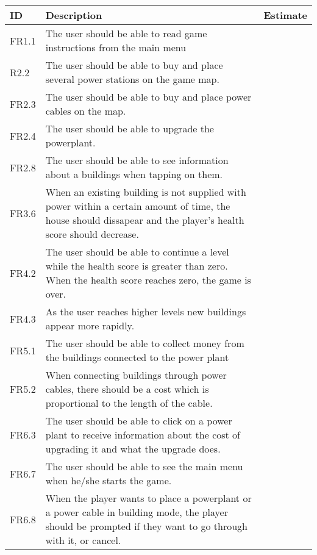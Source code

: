 	\begin{tabular}{| p{1cm} | p{8cm} | p{3cm} |}
		\hline
		\rowcolor{gray}
		ID & Description & Estimate \\ \hline
		FR1.1 & The user should be able to read game instructions from the main menu
		& \\ \hline
		
		R2.2 & The user should be able to buy and place several power stations on the game map.
		& \\ \hline

		FR2.3 & The user should be able to buy and place power cables on the map. &  \\ \hline

		FR2.4 & The user should be able to upgrade the powerplant. & \\ \hline

		FR2.8 & The user should be able to see information about a buildings when tapping on them.
		& \\ \hline

		FR3.6 & When an existing building is not supplied with power within a certain amount of time, 
		the house should dissapear and the player's health score should decrease. & \\ \hline

		FR4.2 & The user should be able to continue a level while the health score is greater than zero. 
		When the health score reaches zero, the game is over. & \\ \hline

		FR4.3 & As the user reaches higher levels new buildings appear more rapidly. & \\ \hline

		FR5.1 & The user should be able to collect money from the buildings connected to the power plant
		& \\ \hline

		FR5.2 & When connecting buildings through power cables, there should be a cost which is 
		proportional to the length of the cable. & \\ \hline

		FR6.3 & The user should be able to click on a power plant to receive information about 
		the cost of upgrading it and what the upgrade does. & \\ \hline

		FR6.7 & The user should be able to see the main menu when he/she starts the game. & \\ \hline

		FR6.8 & When the player wants to place a powerplant or a power cable in building mode, 
		the player should be prompted if they want to go through with it, or cancel. & \\ \hline


\end{tabular}

